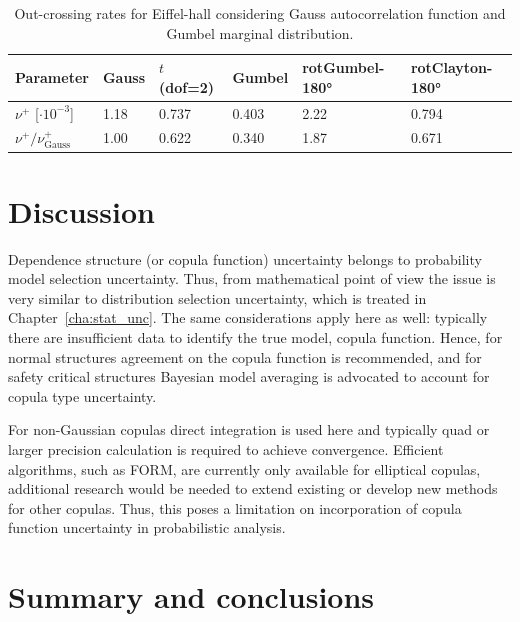 \begin{table}[htbp!]
\caption{Out-crossing rates for Eiffel-hall considering Gauss autocorrelation function and Gumbel marginal distribution.}
\centering
\label{tab:eiffel_nu_p}
\small
    \begin{tabular}{llllll}
    \toprule
    Parameter  & Gauss & $t$ (dof=2) & Gumbel & rotGumbel-180° & rotClayton-180°\\
    \midrule
    \rowcolor{lightgrey} $\nu^+$ [$\cdot 10^{-3}$]  & 1.18 & 0.737 & 0.403 & 2.22 & 0.794  \\
    $\nu^+/\nu_\mathrm{Gauss}^+$  & 1.00 & 0.622 & 0.340 & 1.87 & 0.671 \\
    \bottomrule
    \end{tabular}
\end{table}

\section{Discussion}

Dependence structure (or copula function) uncertainty belongs to probability model selection uncertainty. Thus, from mathematical point of view the issue is very similar to distribution selection uncertainty, which is treated in Chapter~\ref{cha:stat_unc}. The same considerations apply here as well: typically there are insufficient data to identify the true model, copula function. Hence, for normal structures agreement on the copula function is recommended, and for safety critical structures Bayesian model averaging is advocated to account for copula type uncertainty.

For non-Gaussian copulas direct integration is used here and typically quad or larger  precision calculation is required to achieve convergence. Efficient algorithms, such as FORM, are currently only available for elliptical copulas, additional research would be needed to extend existing or develop new methods for other copulas. Thus, this poses a limitation on incorporation of copula function uncertainty in probabilistic analysis.

\section{Summary and conclusions}

